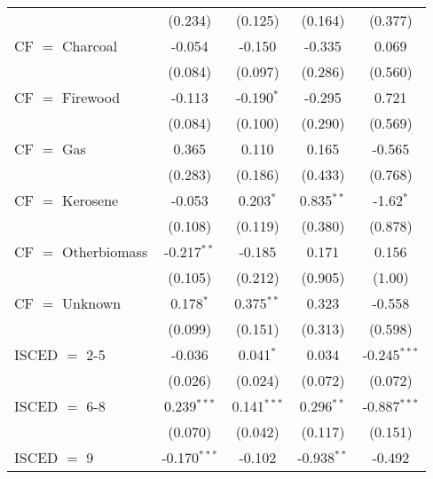 \begin{table}[htbp!]
\begin{adjustbox}{width = 1\textwidth, max height = 0.95\textheight, center}
\begin{threeparttable}[b]
\begin{tabular}{lcccc}
                                 & (0.234)            & (0.125)            & (0.164)        & (0.377)\\   
            CF $=$ Charcoal      & -0.054             & -0.150             & -0.335         & 0.069\\   
                                 & (0.084)            & (0.097)            & (0.286)        & (0.560)\\   
            CF $=$ Firewood      & -0.113             & -0.190$^{*}$       & -0.295         & 0.721\\   
                                 & (0.084)            & (0.100)            & (0.290)        & (0.569)\\   
            CF $=$ Gas           & 0.365              & 0.110              & 0.165          & -0.565\\   
                                 & (0.283)            & (0.186)            & (0.433)        & (0.768)\\   
            CF $=$ Kerosene      & -0.053             & 0.203$^{*}$        & 0.835$^{**}$   & -1.62$^{*}$\\   
                                 & (0.108)            & (0.119)            & (0.380)        & (0.878)\\   
            CF $=$ Otherbiomass  & -0.217$^{**}$      & -0.185             & 0.171          & 0.156\\   
                                 & (0.105)            & (0.212)            & (0.905)        & (1.00)\\   
            CF $=$ Unknown       & 0.178$^{*}$        & 0.375$^{**}$       & 0.323          & -0.558\\   
                                 & (0.099)            & (0.151)            & (0.313)        & (0.598)\\   
            ISCED $=$ 2-5        & -0.036             & 0.041$^{*}$        & 0.034          & -0.245$^{***}$\\   
                                 & (0.026)            & (0.024)            & (0.072)        & (0.072)\\   
            ISCED $=$ 6-8        & 0.239$^{***}$      & 0.141$^{***}$      & 0.296$^{**}$   & -0.887$^{***}$\\   
                                 & (0.070)            & (0.042)            & (0.117)        & (0.151)\\   
            ISCED $=$ 9          & -0.170$^{***}$     & -0.102             & -0.938$^{**}$  & -0.492\\   

\end{tabular}
\end{threeparttable}
\end{adjustbox}
\end{table}
